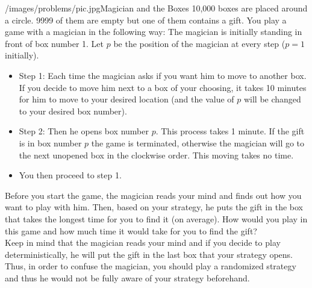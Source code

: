 \begin{problem}{/images/problems/pic.jpg}{Magician and the Boxes} 10,000 boxes are placed around a circle. 9999 of them are empty but one of them contains a gift. You play a game with a magician in the following way: 	The magician is initially standing in front of box number 1. Let $p$ be the position of the magician at every step ($p=1$ initially).
	\begin{itemize}
	\item \textsf{Step 1}: Each time the magician asks if you want him to move to another box. If you decide to move him next to a box of your choosing, it takes 10 minutes for him to move to your desired location (and the value of $p$ will be changed to your desired box number).
	\item \textsf{Step 2}: Then he opens box number $p$. This process takes 1 minute. If the gift is in box number $p$ the game is terminated, otherwise the magician will go to the next unopened box in the clockwise order. This moving takes no time.
	\item You then proceed to step 1.
	\end{itemize}

Before you start the game, the magician reads your mind and finds out how you want to play with him. Then, based on your strategy, he puts the gift in the box that takes the longest time for you to find it (on average). How would you play in this game and how much time it would take for you to find the gift?\\[0.2cm]

Keep in mind that the magician reads your mind and if you decide to play deterministically, he will put the gift in the last box that your strategy opens. Thus, in order to confuse the magician, you should play a randomized strategy and thus he would not be fully aware of your strategy beforehand.

\end{problem}
